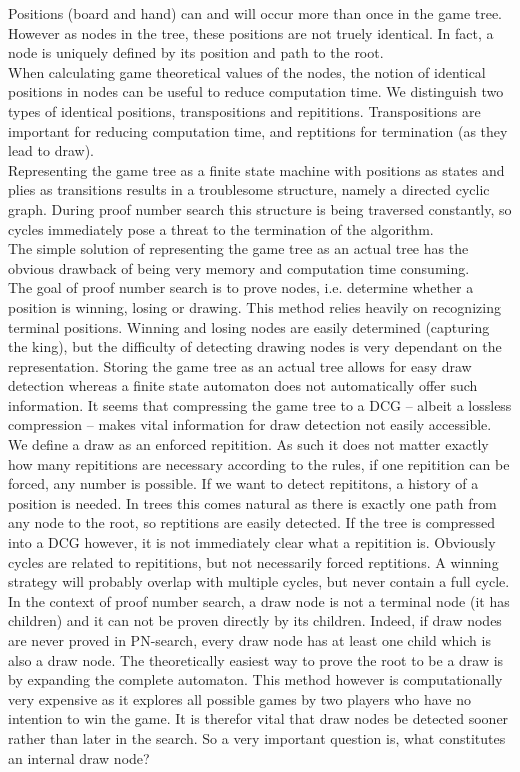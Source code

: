 \documentclass{article}
\begin{document}
Positions (board and hand) can and will occur more than once in the game tree. However as nodes in the tree, these positions are not truely identical.
In fact, a node is uniquely defined by its position and path to the root.\\
When calculating game theoretical values of the nodes, the notion of identical positions in nodes can be useful to reduce computation time.
We distinguish two types of identical positions, transpositions and repititions. Transpositions are important for reducing computation time,
and reptitions for termination (as they lead to draw).\\
Representing the game tree as a finite state machine with positions as states and plies as transitions results in a troublesome structure,
namely a directed cyclic graph. During proof number search this structure is being traversed constantly, so cycles immediately pose a threat to the termination of the algorithm.\\
The simple solution of representing the game tree as an actual tree has the obvious drawback of being very memory and computation time consuming.\\

The goal of proof number search is to prove nodes, i.e. determine whether a position is winning, losing or drawing. This method relies
heavily on recognizing terminal positions. Winning and losing nodes are easily determined (capturing the king), but the difficulty of
detecting drawing nodes is very dependant on the representation. Storing the game tree as an actual tree allows for easy draw detection
whereas a finite state automaton does not automatically offer such information. It seems that compressing the game tree to a DCG -- albeit
a lossless compression -- makes vital information for draw detection not easily accessible.\\

We define a draw as an enforced repitition. As such it does not matter exactly how many repititions are necessary according to the rules,
if one repitition can be forced, any number is possible. If we want to detect repititons, a history of a position is needed. In trees this
comes natural as there is exactly one path from any node to the root, so reptitions are easily detected. If the tree is compressed into a
DCG however, it is not immediately clear what a repitition is. Obviously cycles are related to repititions, but not necessarily forced
reptitions. A winning strategy will probably overlap with multiple cycles, but never contain a full cycle.\\

In the context of proof number search, a draw node is not a terminal node (it has children) and it can not be proven directly by its
children. Indeed, if draw nodes are never proved in PN-search, every draw node has at least one child which is also a draw node.
The theoretically easiest way to prove the root to be a draw is by expanding the complete automaton. This method however is computationally
very expensive as it explores all possible games by two players who have no intention to win the game. It is therefor vital that draw nodes
be detected sooner rather than later in the search. So a very important question is, what constitutes an internal draw node? 
\end{document}

